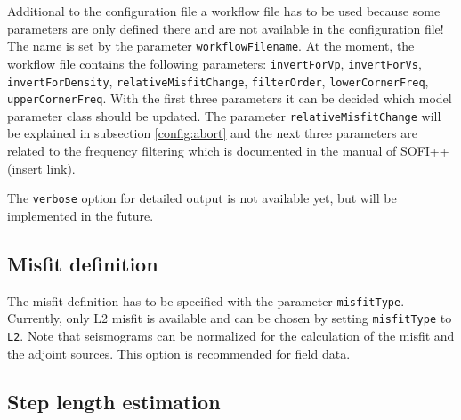 \documentclass[pdftex,a4paper,parskip,listof=totoc,bibliography=totoc,onehalfspacing,12pt]{scrreprt}
\begin{document}
Additional to the configuration file a workflow file has to be used because some parameters are only defined there and are not available in the configuration file! The name is set by the parameter \verb+workflowFilename+. At the moment, the workflow file contains the following parameters: \verb+invertForVp+, \verb+invertForVs+, \verb+invertForDensity+, \verb+relativeMisfitChange+, \verb+filterOrder+, \verb+lowerCornerFreq+, \verb+upperCornerFreq+. With the first three parameters it can be decided which model parameter class should be updated. The parameter \verb+relativeMisfitChange+ will be explained in subsection \ref{config:abort} and the next three parameters are related to the frequency filtering which is documented in the manual of SOFI++ (insert link). 

The \verb+verbose+ option for detailed output is not available yet, but will be implemented in the future.


\subsection{Misfit definition}

The misfit definition has to be specified with the parameter \verb+misfitType+. Currently, only L2 misfit is available and can be chosen by setting \verb+misfitType+ to \verb+L2+. Note that seismograms can be normalized for the calculation of the misfit and the adjoint sources. This option is recommended for field data.

\subsection{Step length estimation}
\end{document}
